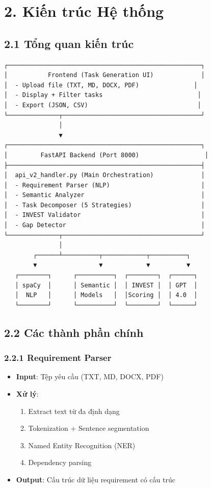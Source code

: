 \documentclass[12pt,a4paper]{article}
\begin{document}
\section{2. Kiến trúc Hệ thống}

\subsection{2.1 Tổng quan kiến trúc}
\begin{verbatim}
┌─────────────────────────────────────────────────────┐
│           Frontend (Task Generation UI)             │
│  - Upload file (TXT, MD, DOCX, PDF)               │
│  - Display + Filter tasks                          │
│  - Export (JSON, CSV)                              │
└──────────────┬──────────────────────────────────────┘
               │
               ▼
┌─────────────────────────────────────────────────────┐
│         FastAPI Backend (Port 8000)                  │
├─────────────────────────────────────────────────────┤
│  api_v2_handler.py (Main Orchestration)             │
│  - Requirement Parser (NLP)                         │
│  - Semantic Analyzer                                │
│  - Task Decomposer (5 Strategies)                   │
│  - INVEST Validator                                 │
│  - Gap Detector                                     │
└──────────────┬──────────────────────────────────────┘
               │
        ┌──────┴──────────┬────────────┬──────────┐
        ▼                 ▼            ▼          ▼
   ┌────────┐      ┌──────────┐  ┌────────┐  ┌──────┐
   │ spaCy  │      │ Semantic │  │ INVEST │  │ GPT  │
   │  NLP   │      │ Models   │  │Scoring │  │ 4.0  │
   └────────┘      └──────────┘  └────────┘  └──────┘
\end{verbatim}

\subsection{2.2 Các thành phần chính}

\subsubsection{2.2.1 Requirement Parser}
\begin{itemize}
    \item \textbf{Input}: Tệp yêu cầu (TXT, MD, DOCX, PDF)
    \item \textbf{Xử lý}:
    \begin{enumerate}
        \item Extract text từ đa định dạng
        \item Tokenization + Sentence segmentation
        \item Named Entity Recognition (NER)
        \item Dependency parsing
    \end{enumerate}
    \item \textbf{Output}: Cấu trúc dữ liệu requirement có cấu trúc
\end{itemize}
\end{document}

